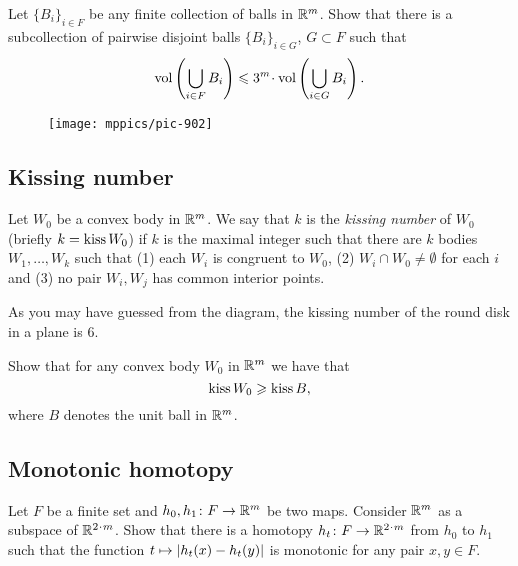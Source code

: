 \begin{pr}
Let $\{B_i\}_{i\in F}$ be any finite collection of  balls in $\RR^m$. 
Show that there is a subcollection of pairwise disjoint balls $\{B_i\}_{i\in G}$, $G\subset F$
such that
\[\vol \left(\bigcup_{i\in F}B_i\right)\le 3^m\cdot \vol \left(\bigcup_{i\in G}B_i\right).\]
\end{pr}



{


\begin{wrapfigure}{r}{27 mm}
\vskip0mm
\centering
\texttt{[image: mppics/pic-902]}
\end{wrapfigure}

\subsection*{Kissing number\easy}\label{pr:Kissing number}


Let  $W_0$ be a convex body in $\RR^m$.
We say that $k$ is the \emph{kissing number} of $W_0$ (briefly $k=\mathop{\rm kiss}W_0$)
if $k$ is the maximal integer such that there are $k$ bodies $W_1,\dots,W_k$ such that 
(1) each $W_i$ is congruent to $W_0$,
(2) $W_i\cap W_0\not=\emptyset$ for each $i$ 
and (3) no pair $W_i,W_j$ has common interior points.

}

As you may have guessed from the diagram, the kissing number of the round disk in a plane is $6$.

\begin{pr}
Show that for any convex body $W_0$ in $\RR^m$ we have that
$$\mathop{\rm kiss}W_0\ge \mathop{\rm kiss}B,$$
where $B$ denotes the unit ball in $\RR^m$.
\end{pr}

\subsection*{Monotonic homotopy}
\label{mono-homotopy}




\begin{pr}
Let $F$ be a finite set and $h_0,h_1\: F\to\RR^m$ be two maps.
Consider $\RR^m$ as a subspace of $\RR^{2\cdot m}$.
Show that there is a homotopy  $h_t\:F\z\to\RR^{2\cdot m}$ from $h_0$ to $h_1$ such that  the function 
$t\z\mapsto |h_t(x)-h_t(y)|$
is monotonic for any pair $x,y\in F$.
\end{pr}

